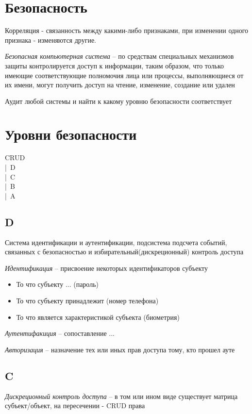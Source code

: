 \documentclass[12pt, a4paper]{article}
\begin{document}
\section{Безопасность}

Корреляция - связанность между какими-либо признаками, при изменении одного признака - изменяются другие.

\emph{Безопасная компьютерная система} -- по средствам специальных механизмов защиты контролируется доступ к информации, таким образом, что только имеющие соответствующие полномочия лица или процессы, выполняющиеся от их имени, могут получить доступ на чтение, изменение, создание или удален


Аудит любой системы и найти к какому уровню безопасности соответствует 

\section{Уровни безопасности}

CRUD \\ 
|\ D \\
|\ C \\
|\ B \\
|\ A \\

\subsection{D}

Система идентификации и аутентификации, подсистема подсчета событий, связанных с безопасностью и избирательный(дискреционный) контроль доступа

\emph{Идентификация} -- присвоение некоторых идентификаторов субъекту

\begin{itemize}
    \item То что субъекту ... (пароль)
    \item То что субъекту принадлежит (номер телефона)
    \item То что является характеристикой субъекта (биометрия)
\end{itemize}

\emph{Аутентифакиция} -- сопоставление ...

\emph{Авторизация} -- назначение тех или иных прав доступа тому, кто прошел ауте

\subsection{C}
\emph{Дискреционный контроль доступа} -- в том или ином виде существует матрица субъект/объект, на пересечении - CRUD права
\end{document}

